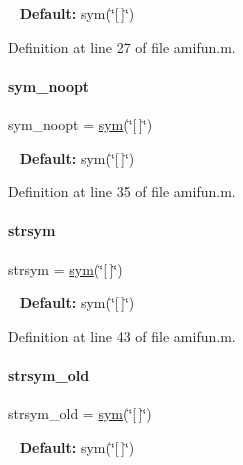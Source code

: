 ~\newline
{\bfseries{Default\+:}} sym(\char`\"{}\mbox{[}$\,$\mbox{]}\char`\"{}) 

Definition at line 27 of file amifun.\+m.

\mbox{\label{classamifun_a653c7ed7ae2eeb18b7cb2f0a6be8ab5b}} 
\paragraph{\texorpdfstring{sym\_noopt}{sym\_noopt}}
{\footnotesize\ttfamily sym\+\_\+noopt = \mbox{\hyperlink{classamifun_a3c48fff3d28406486a4f1b5e18da7ca6}{sym}}(\char`\"{}\mbox{[}$\,$\mbox{]}\char`\"{})}

~\newline
{\bfseries{Default\+:}} sym(\char`\"{}\mbox{[}$\,$\mbox{]}\char`\"{}) 

Definition at line 35 of file amifun.\+m.

\mbox{\label{classamifun_a4814315a739f43461b003c1c1ef6f550}} 
\paragraph{\texorpdfstring{strsym}{strsym}}
{\footnotesize\ttfamily strsym = \mbox{\hyperlink{classamifun_a3c48fff3d28406486a4f1b5e18da7ca6}{sym}}(\char`\"{}\mbox{[}$\,$\mbox{]}\char`\"{})}

~\newline
{\bfseries{Default\+:}} sym(\char`\"{}\mbox{[}$\,$\mbox{]}\char`\"{}) 

Definition at line 43 of file amifun.\+m.

\mbox{\label{classamifun_ac42759baa6575c9d39f487be5a2e01a1}} 
\paragraph{\texorpdfstring{strsym\_old}{strsym\_old}}
{\footnotesize\ttfamily strsym\+\_\+old = \mbox{\hyperlink{classamifun_a3c48fff3d28406486a4f1b5e18da7ca6}{sym}}(\char`\"{}\mbox{[}$\,$\mbox{]}\char`\"{})}

~\newline
{\bfseries{Default\+:}} sym(\char`\"{}\mbox{[}$\,$\mbox{]}\char`\"{}) 


